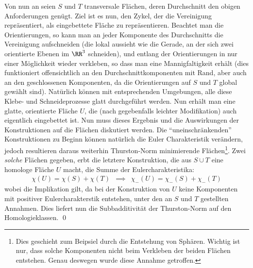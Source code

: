             Von nun an seien $S$ und $T$ transversale Flächen, deren Durchschnitt den obigen Anforderungen genügt. Ziel ist es nun, den Zykel, der die Vereinigung repräsentiert, als eingebettete Fläche zu repräsentieren. Beachtet man die Orientierungen, so kann man an jeder Komponente des Durchschnitts die Vereinigung aufschneiden (die lokal aussieht wie die Gerade, an der sich zwei orientierte Ebenen im $\RR^3$ schneiden), und entlang der Orientierungen in nur einer Möglichkeit wieder verkleben, so dass man eine Mannigfaltigkeit erhält (dies funktioniert offensichtlich an den Durchschnittkomponenten mit Rand, aber auch an den geschlossenen Komponenten, da die Orientierungen auf $S$ und $T$ global gewählt sind). Natürlich können mit entsprechenden Umgebungen, alle diese Klebe- und Schneideprozesse glatt durchgeführt werden. Nun erhält man eine glatte, orientierte Fläche $U$, die (nach gegebenfalls leichter Modifikation) auch eigentlich eingebettet ist. Nun muss dieses Ergebnis und die Auswirkungen der Konstruktionen auf die Flächen diskutiert werden. Die "`uneinschränkenden"' Konstruktionen zu Beginn können natürlich die Euler Charakteristik verändern, jedoch resultieren daraus weiterhin Thurston-Norm minimierende Flächen\footnote{Dies geschieht zum Beipsiel durch die Entstehung von Sphären. Wichtig ist nur, dass solche Komponenten nicht beim Verkleben der beiden Flächen entstehen. Genau deswegen wurde diese Annahme getroffen.}. Zwei \emph{solche} Flächen gegeben, erbt die letztere Konstruktion, die aus $S\cup T$ eine homologe Fläche $U$ macht, die Summe der Eulercharakteristika:
            \begin{eqnarray*}
                \chi(U) = \chi(S) + \chi(T) &\implies& \chi_-(U)=\chi_-(S) + \chi_-(T) 
            \end{eqnarray*}
            wobei die Implikation gilt, da bei der Konstruktion von $U$ keine Komponenten mit positiver Eulercharakterstik entstehen, unter den an $S$ und $T$ gestellten Annahmen. Dies liefert nun die Subbadditivität der Thurston-Norm auf den Homologieklassen.
        \qed
        \vspace{6pt}

